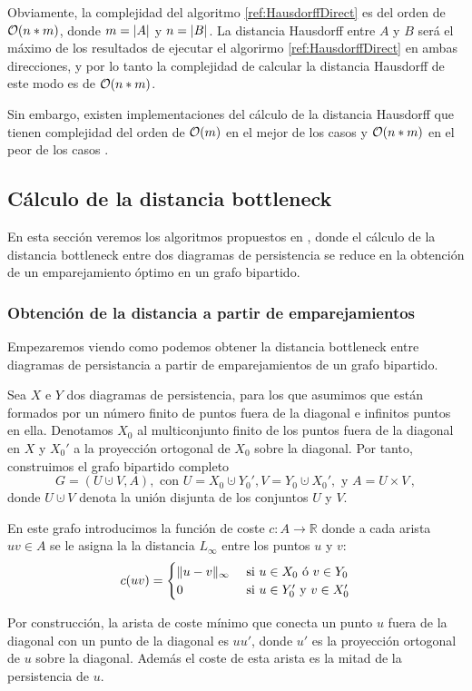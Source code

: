 Obviamente, la complejidad del algoritmo \ref{ref:HausdorffDirect} es del orden de $\mathcal{O}(n*m)$, donde $m = \lvert A\rvert$ y $n = \lvert B\rvert$. La distancia Hausdorff entre $A$ y $B$  será el máximo de los resultados de ejecutar el algorirmo \ref{ref:HausdorffDirect} en ambas direcciones, y por lo tanto la complejidad de calcular la distancia Hausdorff de este modo es de $\mathcal{O}(n*m)$.

Sin embargo, existen implementaciones del cálculo de la distancia Hausdorff que tienen complejidad del orden de $\mathcal{O}(m)$ en el mejor de los casos y $\mathcal{O}(n*m)$ en el peor de los casos \cite{ArticuloHausdorff}. 
\subsection{Cálculo de la distancia bottleneck}
En esta sección veremos los algoritmos propuestos en \cite{libroEH}, donde el cálculo de la distancia bottleneck entre dos diagramas de persistencia se reduce en la obtención de un emparejamiento óptimo en un grafo bipartido.

\subsubsection*{Obtención de la distancia a partir de emparejamientos}
Empezaremos viendo como podemos obtener la distancia bottleneck entre diagramas de persistancia a partir de emparejamientos de un grafo bipartido.

Sea $X$ e $Y$ dos diagramas de persistencia, para los que asumimos que están formados por un número finito de puntos fuera de la diagonal e infinitos puntos en ella. Denotamos $X_0$ al multiconjunto finito de los puntos fuera de la diagonal en $X$ y $X_0'$ a la proyección ortogonal de $X_0$ sobre la diagonal. Por tanto, construimos el grafo bipartido completo
\[
G= (U \cupdot V, A), \text{ con } U=X_0 \cupdot Y_0', V=Y_0 \cupdot X_0', \text{ y } A=U\times V\,,
\]
donde $U \cupdot V$ denota la unión disjunta de los conjuntos $U$ y $V$.

En este grafo introducimos la función de coste $c: A \to \mathbb{R}$ donde a cada arista $uv \in A$ se le asigna la la distancia $L_\infty$ entre los puntos $u$ y $v$:
\[
c(uv)=
\begin{cases}
\lVert u-v\rVert_\infty & \text{ si } u \in X_0 \text{ ó } v \in Y_0   \\ 
0 & \text{ si } u \in Y_0' \text{ y } v \in X_0' 
\end{cases}
\]

\begin{remark}
Por construcción, la arista de coste mínimo que conecta un punto $u$ fuera de la diagonal con un punto de la diagonal es $uu'$, donde $u'$ es la proyección ortogonal de $u$ sobre la diagonal. Además el coste de esta arista es la mitad de la persistencia de $u$. 
\end{remark}

